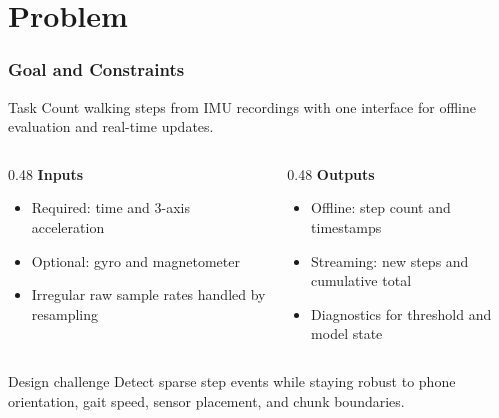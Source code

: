 \section{Problem}

\begin{frame}
    \frametitle{Goal and Constraints}
    \small
    \begin{block}{Task}
        Count walking steps from IMU recordings with one interface for offline evaluation and real-time updates.
    \end{block}

    \begin{columns}[t]
        \begin{column}{0.48\textwidth}
            \textbf{Inputs}
            \begin{itemize}
                \item Required: time and 3-axis acceleration
                \item Optional: gyro and magnetometer
                \item Irregular raw sample rates handled by resampling
            \end{itemize}
        \end{column}
        \begin{column}{0.48\textwidth}
            \textbf{Outputs}
            \begin{itemize}
                \item Offline: step count and timestamps
                \item Streaming: new steps and cumulative total
                \item Diagnostics for threshold and model state
            \end{itemize}
        \end{column}
    \end{columns}

    \vspace{0.1cm}
    \begin{alertblock}{Design challenge}
        Detect sparse step events while staying robust to phone orientation, gait speed, sensor placement, and chunk boundaries.
    \end{alertblock}
\end{frame}
